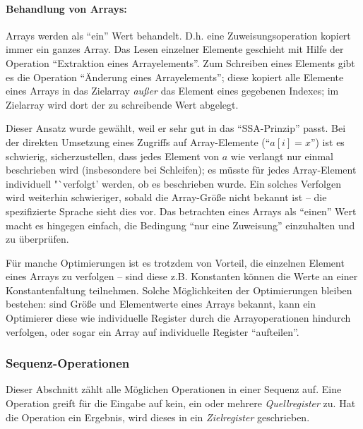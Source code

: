 \documentclass[twoside,a4paper,fleqn,12pt]{article}
\begin{document}


\paragraph{Behandlung von Arrays:}
Arrays werden als "`ein"' Wert behandelt. D.h. eine Zuweisungsoperation kopiert immer ein ganzes Array.
Das Lesen einzelner Elemente geschieht mit Hilfe der Operation "`Extraktion eines Arrayelements"'.
Zum Schreiben eines Elements gibt es die Operation "`Änderung eines Arrayelements"'; diese kopiert alle Elemente
eines Arrays in das Zielarray \emph{außer} das Element eines gegebenen Indexes; im Zielarray wird dort der zu
schreibende Wert abgelegt.

Dieser Ansatz wurde gewählt, weil er sehr gut in das "`SSA-Prinzip"' passt.
Bei der direkten Umsetzung eines Zugriffs auf Array-Elemente ("`$a[i] = x$"') ist es schwierig, sicherzustellen, dass
jedes Element von $a$ wie verlangt nur einmal beschrieben wird (insbesondere bei Schleifen); es
müsste für jedes Array-Element individuell "`verfolgt' werden, ob es beschrieben wurde.
Ein solches Verfolgen wird weiterhin schwieriger, sobald die Array-Größe nicht bekannt ist
-- die spezifizierte Sprache sieht dies vor. Das betrachten eines Arrays als "`einen"' Wert macht es hingegen einfach,
die Bedingung "`nur eine Zuweisung"' einzuhalten und zu überprüfen.

Für manche Optimierungen ist es trotzdem von Vorteil, die einzelnen Element eines Arrays zu verfolgen -- sind diese
z.B. Konstanten können die Werte an einer Konstantenfaltung teilnehmen. Solche Möglichkeiten der Optimierungen
bleiben bestehen: sind Größe und Elementwerte eines Arrays bekannt, kann ein Optimierer diese wie individuelle
Register durch die Arrayoperationen hindurch verfolgen, oder sogar ein Array auf individuelle Register "`aufteilen"'.

\subsubsection{Sequenz-Operationen}

Dieser Abschnitt zählt alle Möglichen Operationen in einer Sequenz auf. Eine Operation greift für die Eingabe auf kein, ein oder mehrere
\emph{Quellregister} zu. Hat die Operation ein Ergebnis, wird dieses in ein \emph{Zielregister} geschrieben. 
\end{document}
